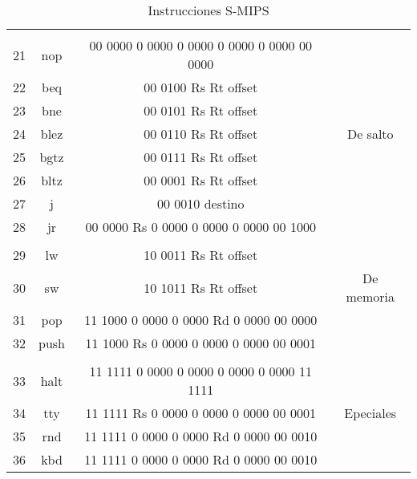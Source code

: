 \documentclass[12pt]{amsart}
\begin{document}
\begin{table}[t]
\begin{center}
\begin{tabular}{  | c | c | c | c | }
&& &\\
21 & nop &				 00 0000 0 0000 0 0000 0 0000 0 0000 00 0000 &\\ 
22 &beq &			 	00 0100 Rs Rt offset &\\
23 & bne	&			 00 0101 Rs Rt offset &\\
24 & blez	&			 00 0110 Rs Rt offset & De salto\\
25 & bgtz	&			 00 0111 Rs Rt offset &\\
26 & bltz	&			 00 0001 Rs Rt offset &\\
27 &j		&			 00 0010 destino &\\
28 & jr	&			00 0000 Rs 0 0000 0 0000 0 0000 00 1000 &\\ \hline

&& &\\
29 &lw&				 10 0011 Rs Rt offset &\\
30 &sw&				10 1011 Rs Rt offset & De memoria\\
31 &pop&				11 1000 0 0000 0 0000 Rd 0 0000 00 0000 &\\
32 &push&				11 1000 Rs 0 0000 0 0000 0 0000 00 0001 &\\ \hline

&& &\\
33& halt &				11 1111 0 0000 0 0000 0 0000 0 0000 11 1111 &\\
34& tty&			           11 1111 Rs 0 0000 0 0000 0 0000 00 0001 & Epeciales\\
35& rnd&				11 1111 0 0000 0 0000 Rd 0 0000 00 0010 &\\
36&  kbd&				11 1111 0 0000 0 0000 Rd 0 0000 00 0010 &\\ \hline

\end{tabular} 
\caption{Instrucciones S-MIPS}
\end{center}
\end{table} 
	
	\bigskip\bigskip
	
	
	
\end{document}
